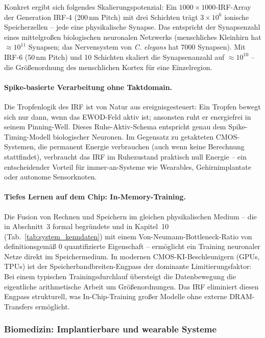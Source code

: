 ﻿\documentclass[a4paper,12pt]{scrreprt}
\theoremstyle{definition}
\begin{document}
Konkret ergibt sich folgendes Skalierungspotenzial: Ein $1000 \times 1000$-IRF-Array
der Generation IRF-4 (200\,nm Pitch) mit drei Schichten trägt
$3 \times 10^6$ ionische Speicherzellen -- jede eine physikalische Synapse.
Das entspricht der Synapsenzahl eines mittelgroßen biologischen neuronalen
Netzwerks (menschliches Kleinhirn hat $\approx 10^{11}$ Synapsen; das
Nervensystem von \textit{C. elegans} hat 7000 Synapsen). Mit IRF-6
(50\,nm Pitch) und 10 Schichten skaliert die Synapsenanzahl auf
$\approx 10^{10}$ -- die Größenordnung des menschlichen Kortex für
eine Einzelregion.

\paragraph{Spike-basierte Verarbeitung ohne Taktdomain.}
Die Tropfenlogik des IRF ist von Natur aus ereignisgesteuert: Ein Tropfen
bewegt sich nur dann, wenn das EWOD-Feld aktiv ist; ansonsten ruht er
energiefrei in seinem Pinning-Well. Dieses Ruhe-Aktiv-Schema entspricht
genau dem Spike-Timing-Modell biologischer Neuronen. Im Gegensatz zu
getakteten CMOS-Systemen, die permanent Energie verbrauchen (auch wenn
keine Berechnung stattfindet), verbraucht das IRF im Ruhezustand
praktisch null Energie -- ein entscheidender Vorteil für immer-an-Systeme
wie Wearables, Gehirnimplantate oder autonome Sensorknoten.

\paragraph{Tiefes Lernen auf dem Chip: In-Memory-Training.}
Die Fusion von Rechnen und Speichern im gleichen physikalischen Medium --
die in Abschnitt~3 formal begründete und in Kapitel~10 (Tab.~\ref{tab:system_kenndaten})
mit einem Von-Neumann-Bottleneck-Ratio von definitionsgemäß 0 quantifizierte
Eigenschaft -- ermöglicht ein Training neuronaler Netze direkt im Speichermedium.
In modernen CMOS-KI-Beschleunigern (GPUs, TPUs) ist der Speicherbandbreiten-Engpass
der dominante Limitierungsfaktor: Bei einem typischen Trainingsdurchlauf
übersteigt die Datenbewegung die eigentliche arithmetische Arbeit um
Größenordnungen. Das IRF eliminiert diesen Engpass strukturell, was
In-Chip-Training großer Modelle ohne externe DRAM-Transfers ermöglicht.

\subsubsection{Biomedizin: Implantierbare und wearable Systeme}
\label{subsubsec:biomedizin}
\end{document}
